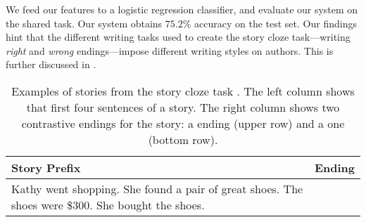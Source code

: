 \documentclass[11pt]{article}
\begin{document}
We feed our features to  a logistic regression classifier, and evaluate our system on the shared task.
Our system obtains $75.2\%$ accuracy on the test set.
Our findings hint that the different writing tasks used to create the story cloze task---writing {\it right} and {\it wrong} endings---impose different writing styles on authors. 
This is further discussed in \cite{Schwartz:2017}.

\begin{table}[!t]
\begin{tabular}{|p{3.5cm}|p{3.5cm}|} \hline
{\bf Story Prefix} & {\bf Ending} \\ \hline
\multirow{2}{*}{\parbox[b][7.5em][c]{3.5cm}{Kathy went shopping. She found a pair of great shoes. The shoes were \$300. She bought the shoes.}}	&{\color{forestgreen}{She felt buyer's remorse after the purchase.}} \\ \cline{2-2}
& {\color{red}{Kathy hated buying shoes.}} \\ \hline
\end{tabular}
\caption{\label{ROC-example}
Examples of stories from the story cloze task \cite{Mostafazadeh:2016}. 
The left column shows that first four sentences of a story. 
The right column shows two contrastive endings for the story:
 a {\color{forestgreen}{coherent}} ending (upper row) and a {\color{red}{incoherent}} one (bottom row).
}
\end{table}
\end{document}
